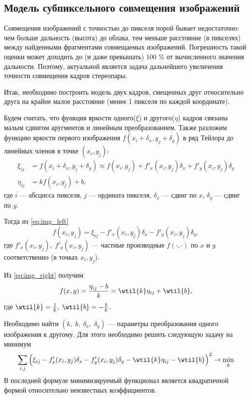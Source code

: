 \subsection{Модель субпиксельного совмещения изображений}\label{subpixel}
Совмещения изображений с точностью до пикселя порой бывает недостаточно: чем больше дальность (высота) до облака, тем меньше расстояние (в пикселях) между найденными фрагментами совмещаемых изображений. Погрешность такой оценки может доходить до (и даже превышать) 100 \% от вычисленного значения дальности. Поэтому, актуальной является задача дальнейшего увеличения точности совмещения кадров стереопары.

Итак, необходимо построить модель двух кадров, смещенных друг относительно друга на крайне малое расстояние (менее 1 пикселя по каждой координате).

Будем считать, что функция яркости одного($\xi$) и другого($\eta$) кадров связаны малым сдвигом аругментов и линейным преобразованием. Также разложим функцию яркости первого изображения $f(x_i+\delta_x, y_j+\delta_y)$ в ряд Тейлора до линейных членов в точке $(x_i, y_j)$:
\begin{subequations} 
\begin{align}
    \xi_{ij} &= f(x_i+\delta_x, y_j+\delta_y) \approx f(x_i, y_j) 
    + f'_x(x_i, y_j)\delta_x + f'_y(x_i, y_j)\delta_y \label{eq:img_left} \\
    \eta_{ij} &= kf(x_i, y_j) + b , \label{eq:img_right}
\end{align}
\end{subequations}
где $i$ --- абсцисса пикселя, $j$ --- ордината пикселя,
$\delta_x$ --- сдвиг по $x$, $\delta_y$ --- сдвиг по $y$.

Тогда из \eqref{eq:img_left}
\begin{equation}
    f(x_i, y_j) = \xi_{ij} - f'_x(x_i, y_j)\delta_x - 
    f'_y(x_i, y_j)\delta_y,
\end{equation}
где $f'_x(x_i, y_j), \; f'_y(x_i, y_j)$ --- частные производные $f(\cdot, \cdot)$ по $x$ и $y$ соответственно (в точках $x_i, y_j$).

Из \eqref{eq:img_right} получим 
\begin{equation}
    f(x, y) = \frac{\eta_{ij}-b}{k} = \wtil{k}\eta_{ij} + \wtil{b},
\end{equation}
где $\wtil{k}=\frac{1}{k}, \; \wtil{b}=-\frac{b}{k}$.


Необходимо найти $(k, \; b, \; \delta_x, \; \delta_y)$ --- параметры преобразования одного изображения к другому. Для этого необходимо решить следующую задачу на минимум
\begin{equation}
    \sum_{i, j} \Big( \xi_{ij} - f'_x(x_i, y_j)\delta_x - f'_y(x_i, y_j)\delta_y - \wtil{k}\eta_{ij} - \wtil{b} \Big)^2 \rightarrow \min_{g}
\end{equation}
В последней формуле минимизируемый функционал является квадратичной
формой относительно неизвестных коэффициентов.

